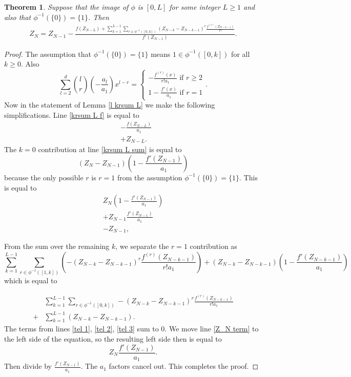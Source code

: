 \documentclass[10pt,a4paper]{amsart}
\newtheorem{theorem}{Theorem}
\begin{document}
\begin{theorem} \label{t main} 
Suppose that the image of $\phi$ is $[0,L]$ for some integer $L \geq 1$ and also that $\phi^{-1}(\{ 0\} )=\{ 1\}$. Then
\begin{align}
Z_N = Z_{N-1} - \frac{f(Z_{N-L})+ \sum_{k=1}^{L-1} \sum_{r \in \phi^{-1}([0,k])} (Z_{N-k} - Z_{N-k-1})^r \frac{f^{(r)}(Z_{N-k-1})}{r!}}{f'(Z_{N-1})}. \label{main}
\end{align}
\end{theorem}

\begin{proof}
 The assumption that $\phi^{-1}(\{ 0\}) = \{ 1\}$ means $1 \in \phi^{-1}([0,k])$ for all $ k \geq 0$. Also 
 \[
 \sum_{l=2}^d { l \choose r} (-\frac{a_l}{a_1})x^{l-r} = 
 \begin{cases} 
 -\frac{f^{(r)}(x)}{r!a_1} \text{ if } r \geq 2 \\ 
 1 -\frac{f'(x)}{a_1} \text{ if } r = 1
 \end{cases}.
 \]
Now in the statement of Lemma \ref{l krsum L} we make the following simplifications. Line \eqref{krsum L f} is equal to 
 \begin{align}
&-\frac{f(Z_{N-L})}{a_1}\\ 
&+ Z_{N-L} \label{tel 1}.
 \end{align}
The $k=0$ contribution at line \eqref{krsum L sum} is equal to 
\[
(Z_{N}-Z_{N-1})(1-\frac{f'(Z_{N-1})}{a_1})
\]
because the only possible $r$ is $r=1$ from the assumption $\phi^{-1}(\{ 0\}) = \{ 1\}$. 
This is equal to 
\begin{align}
Z_N(1-\frac{f'(Z_{N-1})}{a_1}) \label{Z_N term}\\ 
+Z_{N-1}\frac{f'(Z_{N-1})}{a_1} \\
 -Z_{N-1}, \label{tel 2}
\end{align}

From the sum over the remaining $k$, we separate the $r=1$ contribution as 
\[
\sum_{k=1}^{L-1}\sum_{r \in \phi^{-1}([1,k])} \left( -(Z_{N-k} - Z_{N-k-1})^r \frac{f^{(r)}(Z_{N-k-1})}{r!a_1} \right)+  (Z_{N-k} - Z_{N-k-1})(1-\frac{f'(Z_{N-k-1})}{a_1})
\] 
which is equal to 

\begin{align}
&\sum_{k=1}^{L-1}  \sum_{r \in \phi^{-1}([0,k])}-(Z_{N-k} - Z_{N-k-1})^r \frac{f^{(r)}(Z_{N-k-1})}{r!a_1} \\
+ &\sum_{k=1}^{L-1 }  (Z_{N-k} - Z_{N-k-1}). \label{tel 3}
\end{align}
The terms from lines \eqref{tel 1}, \eqref{tel 2}, \eqref{tel 3} sum to 0. 
We move line \eqref{Z_N term} to the left side of the equation, so the resulting left side then is equal to 
\[
Z_N \frac{f'(Z_{N-1})}{a_1}.
\]
Then divide by $\frac{f'(Z_{N-1})}{a_1}$. The $a_1$ factors cancel out. This completes the proof. 
\end{proof}
\end{document}
